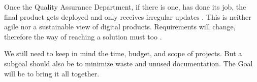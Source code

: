 Once the Quality Assurance Department, if there is one, has done its job, the final product gets deployed and only receives irregular updates \citep{ratcliffe2011agile:18}. This is neither agile nor a sustainable view of digital products. Requirements will change, therefore the way of reaching a solution must too \citep{ratcliffe2011agile:30:31}.  

We still need to keep in mind the time, budget, and scope of projects. But a subgoal should also be to minimize waste and unused documentation. The Goal will be to bring it all together.